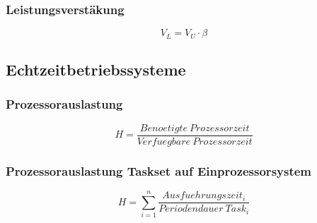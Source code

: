 \subsubsection{Leistungsverstäkung}
\[V_L = V_U \cdot \beta\]


\subsection{Echtzeitbetriebssysteme}

\subsubsection{Prozessorauslastung}
\[H = \frac{Benoetigte~Prozessorzeit}{Verfuegbare~Prozessorzeit}\]

\subsubsection{Prozessorauslastung Taskset auf Einprozessorsystem}
\[H = \sum_{i=1}^{n}\frac{Ausfuehrungszeit_i}{Periodendauer~Task_i}\]
